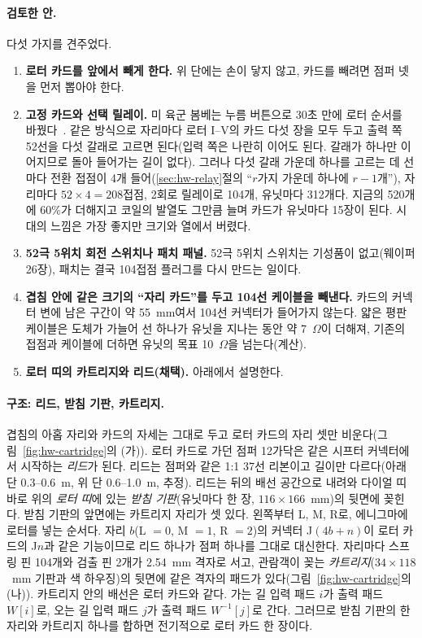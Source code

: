 \paragraph{검토한 안.} 다섯 가지를 견주었다.
\begin{enumerate}
\item \textbf{로터 카드를 앞에서 빼게 한다.} 위 단에는 손이 닿지 않고, 카드를 빼려면 점퍼 넷을 먼저 뽑아야 한다.
\item \textbf{고정 카드와 선택 릴레이.} 미 육군 봄베는 누름 버튼으로 30초 만에 로터 순서를 바꿨다~\cite{dturing2021army}.
같은 방식으로 자리마다 로터 I--V의 카드 다섯 장을 모두 두고 출력 쪽 52선을 다섯 갈래로 고르면 된다(입력 쪽은
나란히 이어도 된다. 갈래가 하나만 이어지므로 돌아 들어가는 길이 없다). 그러나 다섯 갈래 가운데 하나를 고르는 데
선마다 전환 접점이 4개 들어(\ref{sec:hw-relay}절의 ``$r$가지 가운데 하나에 $r-1$개''), 자리마다 $52 \times 4 = 208$접점,
2회로 릴레이로 104개, 유닛마다 312개다. 지금의 520개에 60\%가 더해지고 코일의 발열도 그만큼 늘며 카드가 유닛마다
15장이 된다. 시대의 느낌은 가장 좋지만 크기와 열에서 버렸다.
\item \textbf{52극 5위치 회전 스위치나 패치 패널.} 52극 5위치 스위치는 기성품이 없고(웨이퍼 26장), 패치는 결국
104접점 플러그를 다시 만드는 일이다.
\item \textbf{겹침 안에 같은 크기의 ``자리 카드''를 두고 104선 케이블을 빼낸다.} 카드의 커넥터 변에 남은 구간이 약
55~mm여서 104선 커넥터가 들어가지 않는다. 얇은 평판 케이블은 도체가 가늘어 선 하나가 유닛을 지나는 동안 약
7~$\Omega$이 더해져, 기존의 접점과 케이블에 더하면 유닛의 목표 10~$\Omega$을 넘는다(계산).
\item \textbf{로터 띠의 카트리지와 리드(채택).} 아래에서 설명한다.
\end{enumerate}

\paragraph{구조: 리드, 받침 기판, 카트리지.} 겹침의 아홉 자리와 카드의 자세는 그대로 두고 로터 카드의 자리 셋만
비운다(그림~\ref{fig:hw-cartridge}의 (가)). 로터 카드로 가던 점퍼 12가닥은 같은 시프터 커넥터에서 시작하는
\emph{리드}가 된다. 리드는 점퍼와 같은 1:1 37선 리본이고 길이만 다르다(아래 단 0.3--0.6~m, 위 단 0.6--1.0~m, 추정).
리드는 뒤의 배선 공간으로 내려와 다이얼 띠 바로 위의 \emph{로터 띠}에 있는 \emph{받침 기판}(유닛마다 한 장,
$116 \times 166$~mm)의 뒷면에 꽂힌다. 받침 기판의 앞면에는 카트리지 자리가 셋 있다. 왼쪽부터 L, M, R로, 에니그마에
로터를 넣는 순서다. 자리 $b$(L $= 0$, M $= 1$, R $= 2$)의 커넥터 J$(4b+n)$이 로터 카드의 J$n$과 같은 기능이므로
리드 하나가 점퍼 하나를 그대로 대신한다. 자리마다 스프링 핀 104개와 검출 핀 2개가 2.54~mm 격자로 서고, 관람객이
꽂는 \emph{카트리지}($34 \times 118$~mm 기판과 색 하우징)의 뒷면에 같은 격자의 패드가 있다(그림~\ref{fig:hw-cartridge}의 (나)).
카트리지 안의 배선은 로터 카드와 같다. 가는 길 입력 패드 $i$가 출력 패드 $W[i]$로, 오는 길 입력 패드 $j$가 출력
패드 $W^{-1}[j]$로 간다. 그러므로 받침 기판의 한 자리와 카트리지 하나를 합하면 전기적으로 로터 카드 한 장이다.

